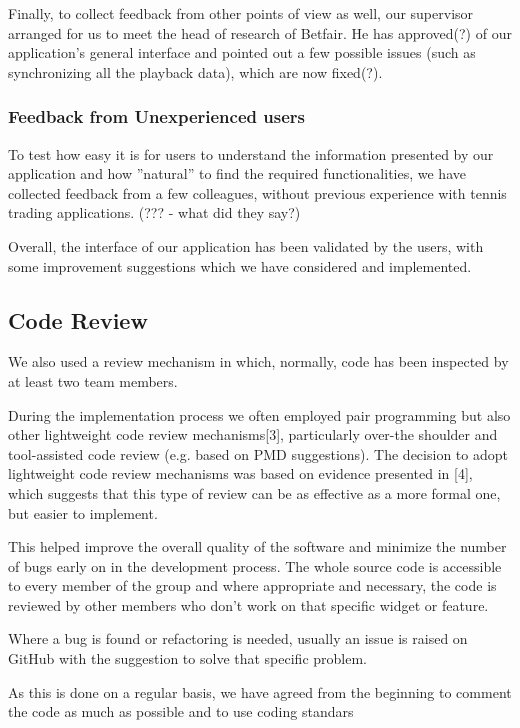 \documentclass[10pt]{article}
\begin{document}
Finally, to collect feedback from other points of view as well, our supervisor arranged for us to meet the head of research of Betfair. He has approved(?) of our application's general interface and pointed out a few possible issues (such as synchronizing all the playback data), which are now fixed(?).

\subsubsection{Feedback from Unexperienced users}

To test how easy it is for users to understand the information presented by our application and how ''natural'' to find the required functionalities, we have collected feedback from a few colleagues, without previous experience with tennis trading applications. (??? - what did they say?)

Overall, the interface of our application has been validated by the users, with some improvement suggestions which we have considered and implemented.


\subsection{Code Review}

We also used a review mechanism in which, normally, code has been inspected by at least two team members.


During the implementation process we often employed pair programming but also other lightweight code review mechanisms[3], particularly over-the shoulder and tool-assisted code review (e.g. based on PMD suggestions).
The decision to adopt lightweight code review mechanisms was based on evidence presented in [4], which suggests that this type of review can be as effective as a more formal one, but easier to implement.

This helped improve the overall quality of the software and minimize the number of bugs early on in the development process.
The whole source code is accessible to every member of the group and where appropriate and necessary, the code is reviewed by other members who don’t work on that specific widget or feature. 

Where a bug is found or refactoring is needed, usually an issue is raised on GitHub with the suggestion to solve that specific problem.

As this is done on a regular basis, we have agreed from the beginning to comment the code as much as possible and to use coding standars
\end{document}

